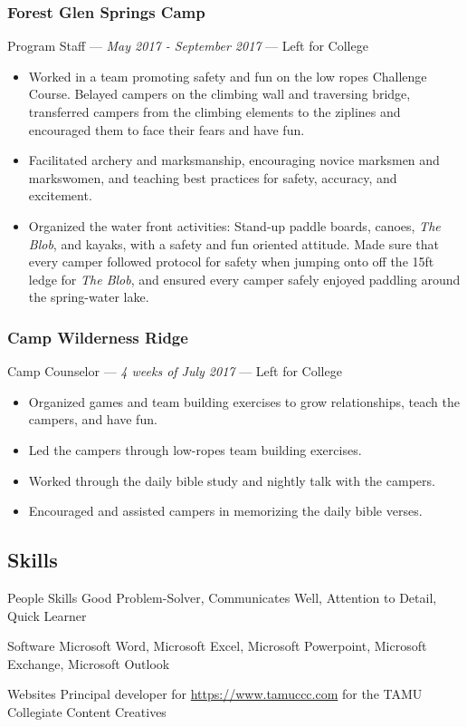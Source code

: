 \documentclass[letterpaper,10pt]{article}
\begin{document}
\subsubsection{Forest Glen Springs Camp}
\hfill Program Staff --- \emph{May 2017 - September 2017} --- Left for College

\begin{itemize}
\tightlist{}
\item
	Worked in a team promoting safety and fun on the low ropes Challenge Course. Belayed campers on the climbing wall and traversing bridge, transferred campers from the climbing elements to the ziplines and encouraged them to face their fears and have fun.
\item
	Facilitated archery and marksmanship, encouraging novice marksmen and markswomen, and teaching best practices for safety, accuracy, and excitement.
\item
	Organized the water front activities: Stand-up paddle boards, canoes, \emph{The Blob}, and kayaks, with a safety and fun oriented attitude. Made sure that every camper followed protocol for safety when jumping onto off the 15ft ledge for \emph{The Blob}, and ensured every camper safely enjoyed paddling around the spring-water lake.
\end{itemize}

\subsubsection{Camp Wilderness Ridge}
\hfill Camp Counselor --- \emph{4 weeks of July 2017} --- Left for College

\begin{itemize}
\tightlist{}
\item
	Organized games and team building exercises to grow relationships, teach the campers, and have fun.
\item
	Led the campers through low-ropes team building exercises.
\item
	Worked through the daily bible study and nightly talk with the campers.
\item
	Encouraged and assisted campers in memorizing the daily bible verses.	
\end{itemize}

\subsection{Skills}

\begin{skills}
\item[People Skills]
  Good Problem-Solver, Communicates Well, Attention to Detail, Quick Learner
\item[Software]
  Microsoft Word, Microsoft Excel, Microsoft Powerpoint, Microsoft Exchange, Microsoft Outlook
\item[Websites]
	Principal developer for \href{https://www.tamuccc.com}{https://www.tamuccc.com} for the TAMU Collegiate Content Creatives
\end{skills}
\end{document}
